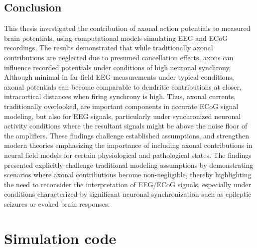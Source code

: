\documentclass[final, a4paper,masters,en,listoffigures,listoftables,norwegiandates]{NMBU}
\begin{document}
\subsection{Conclusion}
This thesis investigated the contribution of axonal action potentials to measured brain potentials, using computational models simulating EEG and ECoG recordings. The results demonstrated that while traditionally axonal contributions are neglected due to presumed cancellation effects, axons can influence recorded potentials under conditions of high neuronal synchrony. Although minimal in far-field EEG measurements under typical conditions, axonal potentials can become comparable to dendritic contributions at closer, intracortical distances when firing synchrony is high. Thus, axonal currents, traditionally overlooked, are important components in accurate ECoG signal modeling, but also for EEG signals, particularly under synchronized neuronal activity conditions where the resultant signals might be above the noise floor of the amplifiers. These findings challenge established assumptions, and strengthen modern theories emphasizing the importance of including axonal contributions in neural field models for certain physiological and pathological states. The findings presented explicitly challenge traditional modeling assumptions by demonstrating scenarios where axonal contributions become non-negligible, thereby highlighting the need to reconsider the interpretation of EEG/ECoG signals, especially under conditions characterized by significant neuronal synchronization such as epileptic seizures or evoked brain responses.

\clearpage
{}
\clearpage
\appendices 
\section{Simulation code}\label{app:simcode}
\inputminted[linenos]{python}{Appendicies/Simulation.py}
\end{document}
